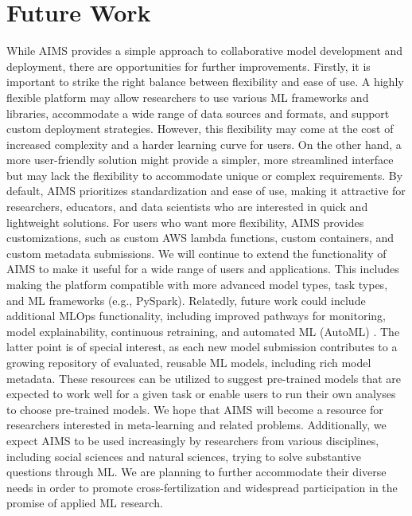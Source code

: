\section{Future Work}
While AIMS provides a simple approach to collaborative model development and deployment, there are opportunities for further improvements. Firstly, it is important to strike the right balance between flexibility and ease of use. A highly flexible platform may allow researchers to use various ML frameworks and libraries, accommodate a wide range of data sources and formats, and support custom deployment strategies. However, this flexibility may come at the cost of increased complexity and a harder learning curve for users. On the other hand, a more user-friendly solution might provide a simpler, more streamlined interface but may lack the flexibility to accommodate unique or complex requirements. By default, AIMS prioritizes standardization and ease of use, making it attractive for researchers, educators, and data scientists who are interested in quick and lightweight solutions. For users who want more flexibility, AIMS provides customizations, such as custom AWS lambda functions, custom containers, and custom metadata submissions. We will continue to extend the functionality of AIMS to make it useful for a wide range of users and applications. This includes making the platform compatible with more advanced model types, task types, and ML frameworks (e.g., PySpark). Relatedly, future work could include additional MLOps functionality, including improved pathways for monitoring, model explainability, continuous retraining, and automated ML (AutoML) \citep{hutter_automated_2019, he_automl_2021}. The latter point is of special interest, as each new model submission contributes to a growing repository of evaluated, reusable ML models, including rich model metadata. These resources can be utilized to suggest pre-trained models that are expected to work well for a given task or enable users to run their own analyses to choose pre-trained models. We hope that AIMS will become a resource for researchers interested in meta-learning \citep{hospedales_meta-learning_2020, finn_model-agnostic_2017} and related problems. Additionally, we expect AIMS to be used increasingly by researchers from various disciplines, including social sciences and natural sciences, trying to solve substantive questions through ML. We are planning to further accommodate their diverse needs in order to promote cross-fertilization and widespread participation in the promise of applied ML research. 

